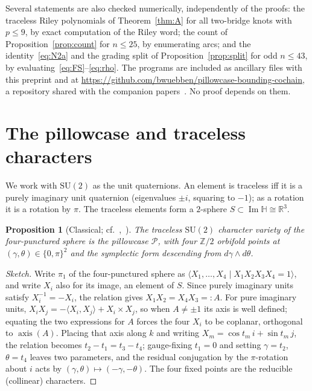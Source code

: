 \documentclass[11pt,reqno]{amsart}
\theoremstyle{plain}
\newtheorem{proposition}[theorem]{Proposition}
\theoremstyle{definition}
\newcommand{\R}{\mathbb{R}}
\newcommand{\Z}{\mathbb{Z}}
\newcommand{\HH}{\mathbb{H}}
\newcommand{\SU}{\mathrm{SU}(2)}
\newcommand{\pill}{\mathcal{P}}
\begin{document}
Several statements are also checked numerically, independently of the proofs: the traceless Riley
polynomials of Theorem~\ref{thm:A} for all two-bridge knots with $p\le9$, by exact computation of the
Riley word; the count of Proposition~\ref{prop:count} for $n\le25$, by enumerating arcs; and the
identity~\eqref{eq:N2a} and the grading split of Proposition~\ref{prop:split} for odd $n\le43$, by
evaluating~\eqref{eq:FS}--\eqref{eq:rho}. The programs are included as ancillary files with this preprint
and at \url{https://github.com/bwuebben/pillowcase-bounding-cochain}, a repository shared with the
companion papers~\cite{WuebbenII,WuebbenIIb,WuebbenIV,WuebbenV}. No proof depends on them.

\section{The pillowcase and traceless characters}\label{sec:pillow}

We work with $\SU$ as the unit quaternions. An element is traceless iff it is a purely imaginary unit
quaternion (eigenvalues $\pm i$, squaring to $-1$); as a rotation it is a rotation by $\pi$. The
traceless elements form a $2$-sphere $S\subset\operatorname{Im}\HH\cong\R^3$.

\begin{proposition}[Classical; cf.~\cite{Lin},~{\cite[Prop.~3.1]{HHK1}}]\label{prop:pillow}
The traceless $\SU$ character variety of the four-punctured sphere is the pillowcase $\pill$, with four
$\Z/2$ orbifold points at $(\gamma,\theta)\in\{0,\pi\}^2$ and the symplectic form descending from
$d\gamma\wedge d\theta$.
\end{proposition}

\begin{proof}[Sketch]
Write $\pi_1$ of the four-punctured sphere as $\langle X_1,\dots,X_4\mid X_1X_2X_3X_4=1\rangle$, and write
$X_i$ also for its image, an element of $S$. Since purely imaginary units satisfy $X_i^{-1}=-X_i$, the
relation gives $X_1X_2=X_4X_3=:A$. For pure imaginary units, $X_iX_j=-\langle X_i,X_j\rangle+X_i\times
X_j$, so when $A\neq\pm1$ its axis is well defined; equating the two expressions for $A$ forces the four
$X_i$ to be coplanar, orthogonal to $\operatorname{axis}(A)$. Placing that axis along $k$ and writing
$X_m=\cos t_m\,i+\sin t_m\,j$, the relation becomes $t_2-t_1=t_3-t_4$; gauge-fixing $t_1=0$ and setting
$\gamma=t_2$, $\theta=t_4$ leaves two parameters, and the residual conjugation by the $\pi$-rotation about
$i$ acts by $(\gamma,\theta)\mapsto(-\gamma,-\theta)$. The four fixed points are the reducible (collinear)
characters.
\end{proof}
\end{document}
